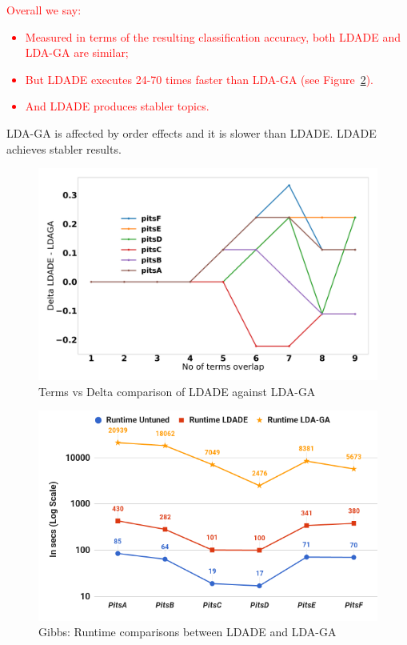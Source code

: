 \documentclass[twocolumn,5p,sort&compress]{elsarticle}
\newcommand{\bi}{\begin{itemize}}
\newcommand{\ei}{\end{itemize}}
\theoremstyle{break}
\begin{document}
\textcolor{red}{Overall we say:
\bi
\item Measured in terms of the
resulting classification accuracy,
both LDADE and LDA-GA are similar;
\item But
LDADE executes  24-70 times faster
than LDA-GA (see Figure~\ref{fig:run_ldaga}).
\item And LDADE produces stabler
topics.
\ei}
 


 

  \begin{lesson}
    LDA-GA is affected by order effects and it is slower than LDADE.  LDADE achieves stabler results. 
  \end{lesson}


\begin{figure}[!t]
  \includegraphics[width=\linewidth]{./fig/ldaga.png}
  \caption{Terms vs Delta comparison of LDADE against LDA-GA}
  \label{fig:ldaga}
\end{figure}

\begin{figure}[!t]
  \includegraphics[width=\linewidth]{./fig/runtime_ga.png}
  \caption{Gibbs: Runtime comparisons between LDADE and LDA-GA}
  \label{fig:run_ldaga}
\end{figure}
\end{document}

